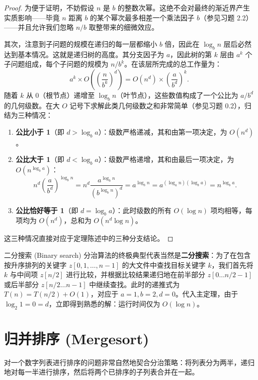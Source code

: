 \begin{proof}
为便于证明，不妨假设 $n$ 是 $b$ 的整数次幂。这绝不会对最终的渐近界产生实质影响——毕竟 $n$ 距离 $b$ 的某个幂次最多相差一个乘法因子 $b$（参见习题 2.2）——并且允许我们忽略 $n/b$ 取整带来的细微效应。

其次，注意到子问题的规模在递归的每一层都缩小 $b$ 倍，因此在 $\log_b n$ 层后必然达到基本情况。这就是递归树的高度。其分支因子为 $a$，因此树的第 $k$ 层由 $a^k$ 个子问题组成，每个子问题的规模为 $n/b^k$。在该层所完成的总工作量为：
\[
a^k \times O\left(\left(\frac{n}{b^k}\right)^d\right) = O(n^d) \times \left(\frac{a}{b^d}\right)^k.
\]
随着 $k$ 从 0（根节点）递增至 $\log_b n$（叶节点），这些数值构成了一个公比为 $a/b^d$ 的几何级数。在大 $O$ 记号下求解此类几何级数之和非常简单（参见习题 0.2），归结为三种情况：
\begin{enumerate}
    \item \textbf{公比小于 1}（即 $d > \log_b a$）：级数严格递减，其和由第一项决定，为 $O(n^d)$。
    \item \textbf{公比大于 1}（即 $d < \log_b a$）：级数严格递增，其和由最后一项决定，为 $O(n^{\log_b a})$：
    \[
    n^d \left(\frac{a}{b^d}\right)^{\log_b n} = n^d \frac{a^{\log_b n}}{(b^{\log_b n})^d} = a^{\log_b n} = a^{(\log_a n)(\log_b a)} = n^{\log_b a}.
    \]
    \item \textbf{公比恰好等于 1}（即 $d = \log_b a$）：此时级数的所有 $O(\log n)$ 项均相等，每项均为 $O(n^d)$，总和为 $O(n^d \log n)$。
\end{enumerate}
这三种情况直接对应于定理陈述中的三种分支结论。
\end{proof}

\begin{sidebarbox}{二分搜索 (Binary search)}
分治算法的终极典型代表当然是\textbf{二分搜索}：为了在包含按升序排列的关键字 $z[0, 1, \dots, n-1]$ 的大文件中查找目标关键字 $k$，我们首先将 $k$ 与中间项 $z[n/2]$ 进行比较，并根据比较结果递归地在前半部分 $z[0 \dots n/2 - 1]$ 或后半部分 $z[n/2 \dots n-1]$ 中继续查找。此时的递推式为 $T(n) = T(n/2) + O(1)$，对应于 $a = 1, b = 2, d = 0$。代入主定理，由于 $\log_2 1 = 0 = d$，立即得到熟悉的解：运行时间仅为 $O(\log n)$。
\end{sidebarbox}

\section{归并排序 (Mergesort)}

对一个数字列表进行排序的问题非常自然地契合分治策略：将列表分为两半，递归地对每一半进行排序，然后将两个已排序的子列表合并在一起。

